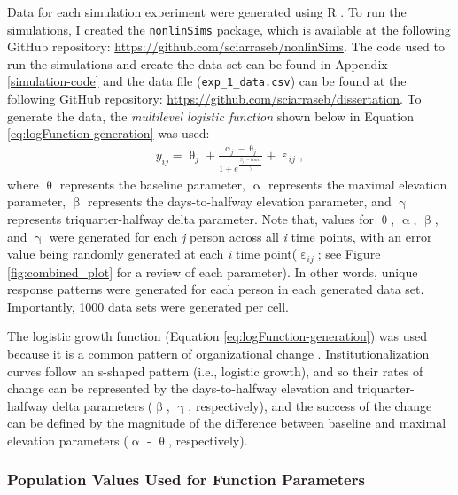 \documentclass[
12pt, %
twoside,
english]{guelphthesis}
\begin{document}
Data for each simulation experiment were generated using R \autocite{rstudio}. To run the simulations, I created the \texttt{nonlinSims} package, which is available at the following GitHub repository: \url{https://github.com/sciarraseb/nonlinSims}. The code used to run the simulations and create the data set can be found in Appendix \ref{simulation-code} and the data file (\texttt{exp\_1\_data.csv}) can be found at the following GitHub repository: \url{https://github.com/sciarraseb/dissertation}. To generate the data, the \emph{multilevel logistic function} shown below in Equation \eqref{eq:logFunction-generation} was used:
\begin{align}
  y_{ij} = \uptheta_j + \frac{\upalpha_j - \uptheta_j}{{1 + e^\frac{\upbeta_j - time_i}{\upgamma_j}}} + \upepsilon_{ij}, 
\label{eq:logFunction-generation}
\end{align}
\noindent where \(\uptheta\) represents the baseline parameter, \(\upalpha\) represents the maximal elevation parameter, \(\upbeta\) represents the days-to-halfway elevation parameter, and \(\upgamma\) represents triquarter-halfway delta parameter. Note that, values for \(\uptheta\), \(\upalpha\), \(\upbeta\), and \(\upgamma\) were generated for each \emph{j} person across all \emph{i} time points, with an error value being randomly generated at each \emph{i} time point(\(\upepsilon_{ij}\); see Figure \ref{fig:combined_plot} for a review of each parameter). In other words, unique response patterns were generated for each person in each generated data set. Importantly, 1000 data sets were generated per cell.

The logistic growth function (Equation \ref{eq:logFunction-generation}) was used because it is a common pattern of organizational change \autocite[or institutionalization;][]{lawrence2001}. Institutionalization curves follow an s-shaped pattern (i.e., logistic growth), and so their rates of change can be represented by the days-to-halfway elevation and triquarter-halfway delta parameters (\(\upbeta\), \(\upgamma\), respectively), and the success of the change can be defined by the magnitude of the difference between baseline and maximal elevation parameters (\(\upalpha\) - \(\uptheta\), respectively).

\hypertarget{population-values-used-for-function-parameters}{%
\subsubsection{Population Values Used for Function Parameters}\label{population-values-used-for-function-parameters}}
\end{document}
